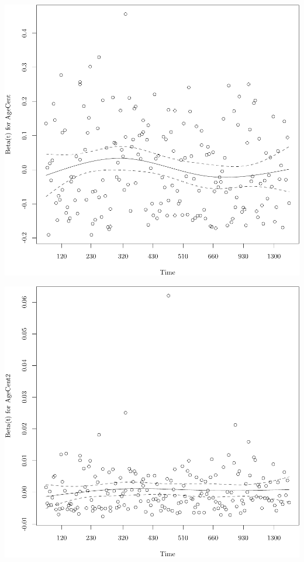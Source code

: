 \documentclass{article}
\begin{document}
\begin{knitrout}
{}




{\centering \includegraphics[width=\maxwidth]{figure/05-eda-ph-check-full-2} 

}




{\centering \includegraphics[width=\maxwidth]{figure/05-eda-ph-check-full-3} 

}
\end{knitrout}
\end{document}
